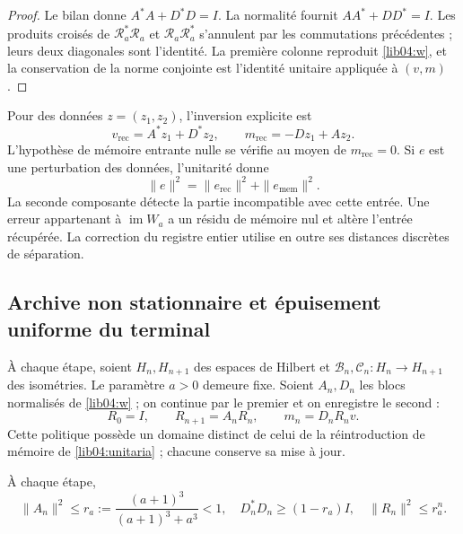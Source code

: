 \begin{proof}
Le bilan donne \(A^*A+D^*D=I\). La normalité fournit
\(AA^*+DD^*=I\). Les produits croisés de
\(\mathscr R_a^*\mathscr R_a\) et
\(\mathscr R_a\mathscr R_a^*\) s’annulent par les commutations
précédentes ; leurs deux diagonales sont l’identité. La première colonne
reproduit \eqref{lib04:w}, et la conservation de la norme conjointe
est l’identité unitaire appliquée à \((v,m)\).
\end{proof}

Pour des données \(z=(z_1,z_2)\), l'inversion explicite est
\begin{equation}
 v_{\mathrm{rec}}=A^*z_1+D^*z_2,\qquad
 m_{\mathrm{rec}}=-Dz_1+Az_2.
 \label{lib04:inversa-unitaria}
\end{equation}
L’hypothèse de mémoire entrante nulle se vérifie au moyen de
\(m_{\mathrm{rec}}=0\). Si \(e\) est une perturbation des données,
l’unitarité donne
\begin{equation}
 \|e\|^2=\|e_{\mathrm{rec}}\|^2+\|e_{\mathrm{mem}}\|^2.
 \label{lib04:descomposicion-ruido}
\end{equation}
La seconde composante détecte la partie incompatible avec cette entrée. Une erreur appartenant à \(\operatorname{im}W_a\) a un résidu de mémoire nul et altère l'entrée récupérée. La correction du registre entier utilise en outre ses distances discrètes de séparation.



\subsection{Archive non stationnaire et épuisement uniforme du terminal}
\label{lib04:archivo}

À chaque étape, soient \(H_n,H_{n+1}\) des espaces de Hilbert et
\(\mathcal B_n,\mathcal C_n:H_n\to H_{n+1}\) des isométries. Le
paramètre \(a>0\) demeure fixe. Soient \(A_n,D_n\) les blocs
normalisés de \eqref{lib04:w} ; on continue par le premier et on
enregistre le second :
\begin{equation}
 R_0=I,\qquad R_{n+1}=A_nR_n,\qquad m_n=D_nR_nv.
 \label{lib04:politica-archivo}
\end{equation}
Cette politique possède un domaine distinct de celui de la réintroduction de
mémoire de \eqref{lib04:unitaria} ; chacune conserve sa mise à jour.

\begin{lemma}
\label{lib04:lem-tasa}
À chaque étape,
\begin{equation}
 \|A_n\|^2\leq r_a:={\frac{(a+1)^3}{(a+1)^3+a^3}}<1,
 \quad D_n^*D_n\geq(1-r_a)I,
 \quad\|R_n\|^2\leq r_a^n.
 \label{lib04:tasa}
\end{equation}
\end{lemma}

